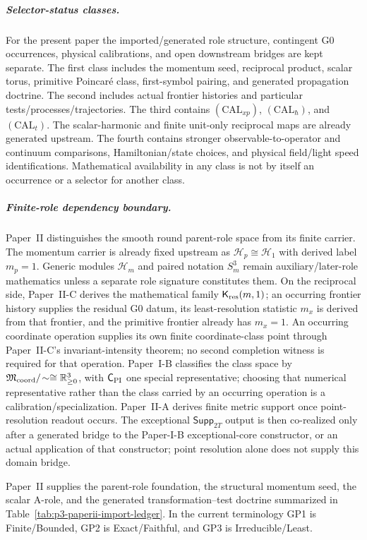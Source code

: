 \documentclass[12pt,a4paper]{article}
\begin{document}
\subparagraph{Selector-status classes.}
For the present paper the imported/generated role structure, contingent G0
occurrences, physical calibrations, and open downstream bridges are kept
separate.  The first class includes the momentum seed, reciprocal product,
scalar torus, primitive Poincar\'e class, first-symbol pairing, and generated
propagation doctrine.  The second includes actual frontier histories and
particular tests/processes/trajectories.  The third contains
$(\mathrm{CAL}_{xp})$, $(\mathrm{CAL}_{\hbar})$, and
$(\mathrm{CAL}_{t})$. The scalar-harmonic and finite unit-only reciprocal
maps are already generated upstream. The fourth contains stronger
observable-to-operator and continuum comparisons, Hamiltonian/state choices,
and physical field/light
speed identifications.  Mathematical availability in any class is not by
itself an occurrence or a selector for another class.

\subparagraph{Finite-role dependency boundary.}
Paper~II distinguishes the smooth round parent-role space from its finite
carrier.  The momentum carrier is already fixed upstream as
$\mathcal H_p\cong\mathcal H_1$ with derived label $m_p=1$.  Generic modules
$\mathcal H_m$ and paired notation $S^3_m$ remain auxiliary/later-role
mathematics unless a separate role signature constitutes them.  On the
reciprocal side, Paper~II-C derives the mathematical family
$\mathsf K_{\rm res}(m,1)$; an occurring frontier history supplies the
residual G0 datum, its least-resolution statistic $m_x$ is derived from that
frontier, and the primitive frontier already has $m_x=1$.  An occurring coordinate operation supplies its own finite
coordinate-class point through Paper~II-C's invariant-intensity theorem; no
second completion witness is required for that operation.  Paper~I-B classifies
the class space by
$\mathfrak M_{\rm coord}/\!\sim\cong\mathbb R_{\ge0}^3$, with
$\mathsf C_{\rm PI}$ one special representative; choosing that numerical
representative rather than the class carried by an occurring operation is a
calibration/specialization.  Paper~II-A derives finite metric support once
point-resolution readout occurs.  The exceptional $\mathsf{Supp}_{2T}$ output
is then co-realized only after a generated bridge to the Paper-I-B
exceptional-core constructor, or an actual application of that constructor;
point resolution alone does not supply this domain bridge.

Paper~II supplies the parent-role foundation, the structural momentum seed, the
scalar A-role, and the generated transformation--test doctrine summarized in
Table~\ref{tab:p3-paperii-import-ledger}.  In the current terminology GP1 is
Finite/Bounded, GP2 is Exact/Faithful, and GP3 is Irreducible/Least.
\end{document}
